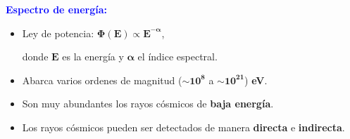     \begin{frame}{} %
        \justifying %
        \vspace*{-0.31cm} %
        


        \begin{columns}
            \begin{column}{0.4\textwidth} %
                \textcolor{blue}{\textbf{Espectro de energía:}}
                \begin{itemize}
                    \item Ley de potencia: $\bm{\Phi}\mathbf{(E) \propto E}^{\bm{-\alpha}}$,
                    
                    donde $\mathbf{E}$ es la energía y $\bm{\alpha}$ el índice espectral.
                    \item Abarca varios ordenes de magnitud ($\sim \bm{10^{8}}$ a $\sim \bm{10^{21}}$) \textbf{eV}.
                    \item Son muy abundantes los rayos cósmicos de \textbf{baja energía}.
                    \item Los rayos cósmicos pueden ser detectados de manera \textbf{directa} e \textbf{indirecta}.
                \end{itemize}
            \end{column}


\end{columns}
\end{frame}
